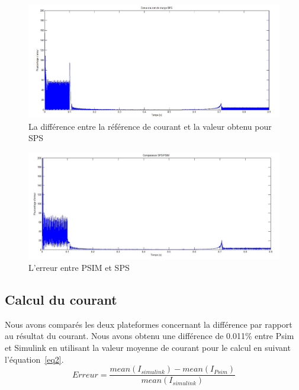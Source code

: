 \documentclass[11pt,letterpaper,final]{report}
\begin{document}
\begin{figure}[ht]
\centering
\includegraphics[scale=0.5]{erreur_SPS.jpg}
\caption{La différence entre la référence de courant et la valeur obtenu pour SPS}
\end{figure}

\begin{figure}[ht]
\centering
\includegraphics[scale=0.5]{comp_PSIM_SPS.jpg}
\caption{L'erreur entre PSIM et SPS}
\label{comp_PSIM_SPS}
\end{figure}
\subsection{Calcul du courant}
Nous avons comparés les deux plateformes concernant la différence par rapport au résultat du courant. Nous avons obtenu une différence de 0.011\%
entre Psim et Simulink en utilisant la valeur moyenne de courant pour le calcul en suivant l'équation~\ref{eq2}. 
\begin{equation}
Erreur = \frac{mean(I_{simulink})-mean(I_{Psim})}{mean(I_{simulink})}
\label{eq2}
\end{equation}
\end{document}
